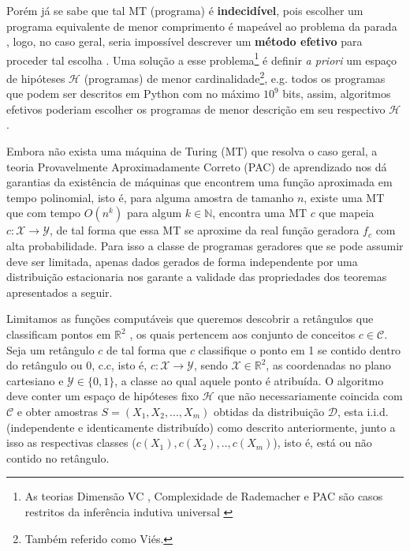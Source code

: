 Porém já se sabe que tal MT (programa) é \textbf{indecidível}, pois escolher um
programa equivalente de menor comprimento é mapeável ao problema da parada
\cite{sipser2012introduction,solomonoff1978complexity}, logo, no caso geral,
seria impossível descrever um \textbf{método efetivo} para proceder tal escolha
\cite{hutter2004universal}. Uma solução a esse problema\footnote{As teorias
Dimensão VC \cite{vapnik2013nature}, Complexidade de Rademacher
\cite{bartlett2002rademacher} e PAC \cite{valiant1984theory} são casos
restritos da inferência indutiva universal
\cite{li1992inductive,blumer1989learnability}} é definir \textit{a priori} um
espaço de hipóteses $\mathcal{H}$ (programas) de menor
cardinalidade\footnote{Também referido como Viés.}, e.g. todos os programas que
podem ser descritos em Python com no máximo $10^9$ bits, assim, algoritmos
efetivos poderiam escolher os programas de menor descrição em seu respectivo
$\mathcal{H}$ \cite{rathmanner2011philosophical}.

Embora não exista uma máquina de Turing (MT) que resolva o caso geral, a teoria
Provavelmente Aproximadamente Correto (PAC) de aprendizado nos dá garantias da
existência de máquinas que encontrem uma função aproximada em tempo polinomial,
isto é, para alguma amostra de tamanho $n$, existe uma MT que com tempo $O(n^k)$
para algum $k \in \mathbb{N}$, encontra uma MT $c$ que mapeia
$c:\mathcal{X}\rightarrow\mathcal{Y}$, de tal forma que essa MT se aproxime da
real função geradora $f_c$ com alta probabilidade. Para isso a classe de
programas geradores que se pode assumir deve ser limitada, apenas dados gerados
de forma independente por uma distribuição estacionaria nos garante a validade
das propriedades dos teoremas apresentados a seguir.

Limitamos as funções computáveis que queremos descobrir a retângulos que
classificam pontos em $\mathbb{R}^2$ , os quais pertencem aos conjunto de
conceitos $c \in \mathcal{C}$. Seja um retângulo $c$ de tal forma que $c$
classifique o ponto em 1 se contido dentro do retângulo ou 0, c.c, isto é,
$c:\mathcal{X}\rightarrow\mathcal{Y}$, sendo $\mathcal{X} \in \mathbb{R}^2$, as
coordenadas no plano cartesiano e $\mathcal{Y} \in \{0,1\}$, a classe ao qual
aquele ponto é atribuída. O algoritmo deve conter um espaço de hipóteses fixo
$\mathcal{H}$ que não necessariamente coincida com $\mathcal{C}$ e obter
amostras $S=(X_1,X_2,...,X_m)$ obtidas da distribuição $\mathcal{D}$, esta
i.i.d. (independente e identicamente distribuído) como descrito anteriormente,
junto a isso as respectivas classes ($c(X_1),c(X_2),..,c(X_m)$), isto é, está
ou não contido no retângulo.

